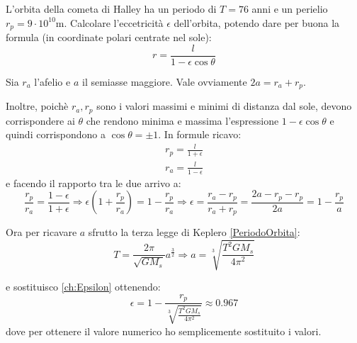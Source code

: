 \documentclass[../main.tex]{subfiles}
\begin{document}
\textex
L'orbita della cometa di Halley ha un periodo di $T=76$ anni e un perielio $r_p=9\cdot10^{10}\mathrm{m}$.
Calcolare l'eccetricità $\epsilon$ dell'orbita, potendo dare per buona la formula (in coordinate polari centrate nel sole):
\begin{equation*}
	r=\frac l{1-\epsilon\cos\theta}
\end{equation*}

\solution
Sia $r_a$ l'afelio e $a$ il semiasse maggiore. Vale ovviamente $2a=r_a+r_p$.

Inoltre, poichè $r_a,r_p$ sono i valori massimi e minimi di distanza dal sole, devono corrispondere ai $\theta$ che rendono minima e massima l'espressione $1-\epsilon\cos\theta$ e quindi corrispondono a $\cos\theta=\pm 1$.
In formule ricavo:
\begin{align*}
	r_p=\frac l{1+\epsilon}\\
	r_a=\frac l{1-\epsilon}
\end{align*}
e facendo il rapporto tra le due arrivo a:
\begin{equation}\label{ch:Epsilon}
	\frac{r_p}{r_a}=\frac{1-\epsilon}{1+\epsilon} \Rightarrow \epsilon \left(1+\frac{r_p}{r_a}\right)=1-\frac{r_p}{r_a} \Rightarrow \epsilon=\frac{r_a-r_p}{r_a+r_p} = \frac{2a-r_p-r_p}{2a}=1-\frac{r_p}a
\end{equation}

Ora per ricavare $a$ sfrutto la terza legge di Keplero \cref{PeriodoOrbita}:
\begin{equation}
	T=\frac{2\pi}{\sqrt{GM_s}}a^{\frac{3}{2}}\Rightarrow a=\sqrt[3]{\frac{T^2GM_s}{4\pi^2}}
\end{equation}

e sostituisco \cref{ch:Epsilon} ottenendo:
\begin{equation*}
	\epsilon=1-\frac{r_p}{\sqrt[3]{\frac{T^2GM_s}{4\pi^2}}}\approx 0.967
\end{equation*}
dove per ottenere il valore numerico ho semplicemente sostituito i valori.
\end{document}
